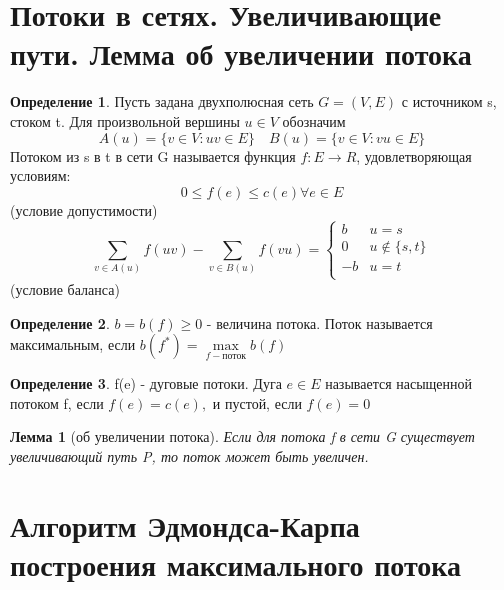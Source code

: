 \documentclass[a4paper]{article}
\newtheorem{lemma}{Лемма}[section]
\theoremstyle{definition}
\newtheorem*{definition}{Определение}
\theoremstyle{remark}
\begin{document}
\begin{multicols*}{2}
    \section{Потоки в сетях. Увеличивающие пути. Лемма об увеличении потока}
    \begin{definition}
        Пусть задана двухполюсная сеть $G = (V, E)$ с источником s, стоком t. Для произвольной вершины $u \in V$ обозначим 
        $$A(u) = \{v\in V : uv\in E\}\quad B(u) = \{v\in V : vu\in E\}$$
        Потоком из s в t в сети G называется функция $f:E\to R$, удовлетворяющая условиям:$$0\leq f(e) \leq c(e) \forall e\in E$$
        (условие допустимости)
        \begin{equation}
            \sum\limits_{v\in A(u)}f(uv) - \sum\limits_{v\in B(u)}f(vu)=
            \begin{cases}
                b & u = s\\
                0 & u\notin\{s, t\}\\
                -b & u = t\\
            \end{cases}
        \end{equation}
        (условие баланса)
    \end{definition}
    \begin{definition}
        $b = b(f)\geq 0$ - величина потока. Поток называется максимальным, если $b(f^*) = \max\limits_{f-\text{поток}}b(f)$
    \end{definition}
    \begin{definition}
        f(e) - дуговые потоки. Дуга $e\in E$ называется насыщенной потоком f, если $f(e) = c(e),$ и пустой, если $f(e) = 0$
    \end{definition}
    \begin{lemma}[об увеличении потока]
        Если для потока f в сети G существует увеличивающий путь P, то поток может быть увеличен.
    \end{lemma}
    \section{Алгоритм Эдмондса-Карпа построения максимального потока}

\end{multicols*}
\end{document}
